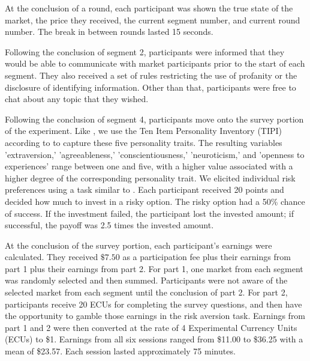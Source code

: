 \documentclass[thesis]{uathesis}
\begin{document}
\begin{body}
At the conclusion of a round, each participant was shown the true state of the market, the price they received, the current segment number, and current round number. The break in between rounds lasted 15 seconds.

Following the conclusion of segment 2, participants were informed that they would be able to communicate with market participants prior to the start of each segment. They also received a set of rules restricting the use of profanity or the disclosure of identifying information. Other than that, participants were free to chat about any topic that they wished.

Following the conclusion of segment 4, participants move onto the survey portion of the experiment. Like \cite{gutsche2023determinants}, we use the Ten Item Personality Inventory (TIPI) according to \cite{gosling2003very} to capture these five personality traits. The resulting variables 'extraversion,' 'agreeableness,'  'conscientiousness,' 'neuroticism,' and 'openness to experiences' range between one and five, with a higher value associated with a higher degree of the corresponding personality trait.  We elicited individual risk preferences using a task similar to \cite{gneezy1997experiment}. Each participant received 20 points and decided how much to invest in a risky option. The risky option had a 50\% chance of success. If the investment failed, the participant lost the invested amount; if successful, the payoff was 2.5 times the invested amount.

At the conclusion of the survey portion, each participant's earnings were calculated. They received $\$7.50$ as a participation fee plus their earnings from part 1 plus their earnings from part 2. For part 1, one market from each segment was randomly selected and then summed. Participants were not aware of the selected market from each segment until the conclusion of part 2. For part 2, participants receive 20 ECUs for completing the survey questions, and then have the opportunity to gamble those earnings in the risk aversion task. Earnings from part 1 and 2 were then converted at the rate of 4 Experimental Currency Units (ECUs) to \$1. Earnings from all six sessions ranged from \$11.00 to \$36.25 with a mean of \$23.57. Each session lasted approximately 75 minutes.

\begin{table}[H]
  \centering
  \caption{Pre-randomized experimental parameters by segment}
  \label{tab:randomized_params}
  
\end{table}


\end{body}
\end{document}

